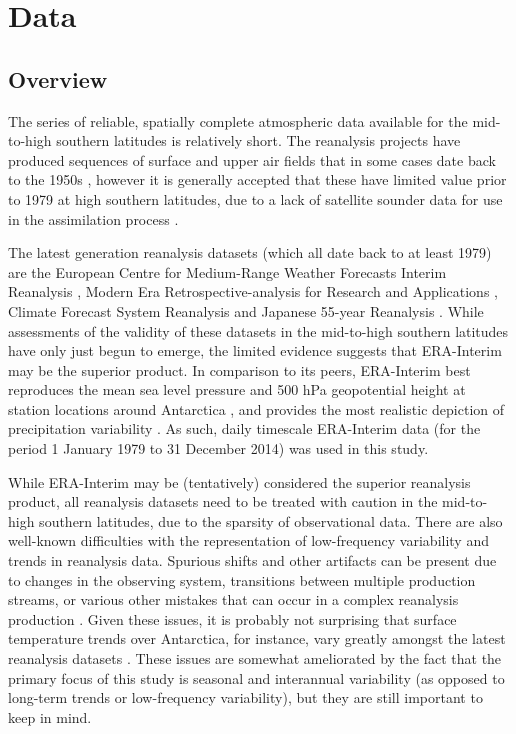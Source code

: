 \section{Data}\label{s:data}

\subsection{Overview}

The series of reliable, spatially complete atmospheric data available for the mid-to-high southern latitudes is relatively short. The reanalysis projects have produced sequences of surface and upper air fields that in some cases date back to the 1950s \citep{Kistler2001,Uppala2005,Kobayashi2015}, however it is generally accepted that these have limited value prior to 1979 at high southern latitudes, due to a lack of satellite sounder data for use in the assimilation process \citep{Hines2000}.

The latest generation reanalysis datasets (which all date back to at least 1979) are the European Centre for Medium-Range Weather Forecasts Interim Reanalysis \citep[ERA-Interim;][]{Dee2011}, Modern Era Retrospective-analysis for Research and Applications \citep[Merra;][]{Rienecker2011}, Climate Forecast System Reanalysis \citep[CFSR;][]{Saha2010} and Japanese 55-year Reanalysis \citep[JRA-55;][]{Kobayashi2015}. While assessments of the validity of these datasets in the mid-to-high southern latitudes have only just begun to emerge, the limited evidence suggests that ERA-Interim may be the superior product. In comparison to its peers, ERA-Interim best reproduces the mean sea level pressure and 500 hPa geopotential height at station locations around Antarctica \citep{Bracegirdle2012}, and provides the most realistic depiction of precipitation variability \citep{Bromwich2011,Nicolas2011}. As such, daily timescale ERA-Interim data (for the period 1 January 1979 to 31 December 2014) was used in this study.

While ERA-Interim may be (tentatively) considered the superior reanalysis product, all reanalysis datasets need to be treated with caution in the mid-to-high southern latitudes, due to the sparsity of observational data. There are also well-known difficulties with the representation of low-frequency variability and trends in reanalysis data. Spurious shifts and other artifacts can be present due to changes in the observing system, transitions between multiple production streams, or various other mistakes that can occur in a complex reanalysis production \citep{Dee2014}. Given these issues, it is probably not surprising that surface temperature trends over Antarctica, for instance, vary greatly amongst the latest reanalysis datasets \citep{Nicolas2014}. These issues are somewhat ameliorated by the fact that the primary focus of this study is seasonal and interannual variability (as opposed to long-term trends or low-frequency variability), but they are still important to keep in mind.

